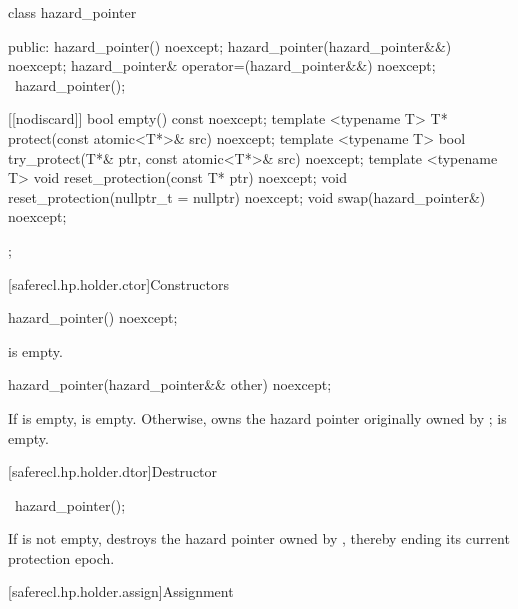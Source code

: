 \begin{codeblock}
class hazard_pointer {
public:
  hazard_pointer() noexcept;
  hazard_pointer(hazard_pointer&&) noexcept;
  hazard_pointer& operator=(hazard_pointer&&) noexcept;
  ~hazard_pointer();
  
  [[nodiscard]] bool empty() const noexcept;
  template <typename T> T* protect(const atomic<T*>& src) noexcept;  
  template <typename T> bool try_protect(T*& ptr, const atomic<T*>& src) noexcept;
  template <typename T> void reset_protection(const T* ptr) noexcept;
  void reset_protection(nullptr_t = nullptr) noexcept;
  void swap(hazard_pointer&) noexcept;
};
\end{codeblock}

[saferecl.hp.holder.ctor]{Constructors}

\begin{itemdecl}
hazard_pointer() noexcept;
\end{itemdecl}

\begin{itemdescr}

\ensures 
{} is empty.

\end{itemdescr}

\begin{itemdecl}
hazard_pointer(hazard_pointer&& other) noexcept;
\end{itemdecl}

\begin{itemdescr}

\ensures 
If  is empty,  is empty. Otherwise,  owns the hazard pointer originally owned by ;  is empty.

\end{itemdescr}

[saferecl.hp.holder.dtor]{Destructor}

\begin{itemdecl}
~hazard_pointer();
\end{itemdecl}

\begin{itemdescr}

\effects 
If  is not empty, destroys the hazard pointer owned by , thereby ending its current protection epoch.

\end{itemdescr}

[saferecl.hp.holder.assign]{Assignment}

